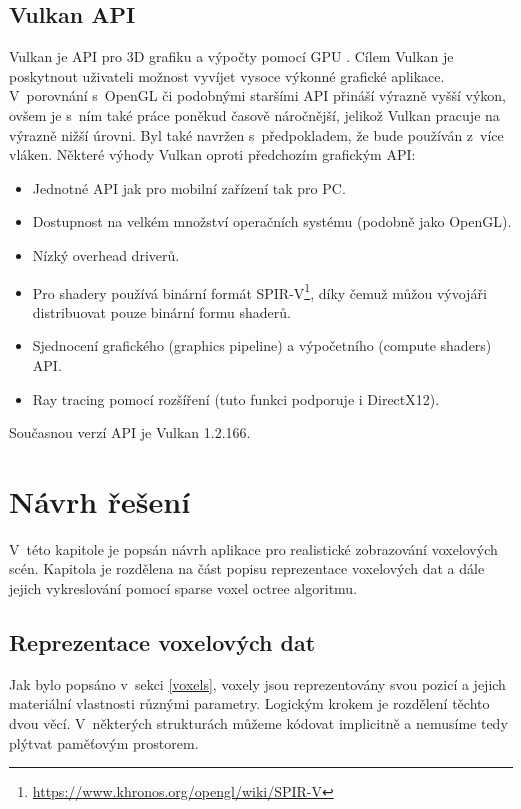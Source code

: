 \section{Vulkan API}
Vulkan je API pro 3D grafiku a výpočty pomocí GPU \cite{vulkan_web}. Cílem Vulkan je poskytnout uživateli možnost vyvíjet vysoce výkonné grafické aplikace. V~porovnání s~OpenGL či podobnými staršími API přináší výrazně vyšší výkon, ovšem je s~ním také práce poněkud časově náročnější, jelikož Vulkan pracuje na výrazně nižší úrovni. Byl také navržen s~předpokladem, že bude používán z~více vláken. Některé výhody Vulkan oproti předchozím grafickým API:

\begin{itemize}
	\item Jednotné API jak pro mobilní zařízení tak pro PC.
	\item Dostupnost na velkém množství operačních systému (podobně jako OpenGL).
	\item Nízký overhead driverů.
	\item Pro shadery používá binární formát SPIR-V\footnote{\url{https://www.khronos.org/opengl/wiki/SPIR-V}}, díky čemuž můžou vývojáři distribuovat pouze binární formu shaderů.
	\item Sjednocení grafického (graphics pipeline) a výpočetního (compute shaders) API.
	\item Ray tracing pomocí rozšíření (tuto funkci podporuje i DirectX12).
\end{itemize}

Současnou verzí API je Vulkan 1.2.166\cite{vulkanspec}.

\chapter{Návrh řešení}
\label{navrh}
V~této kapitole je popsán návrh aplikace pro realistické zobrazování voxelových scén. Kapitola je rozdělena na část popisu reprezentace voxelových dat a dále jejich vykreslování pomocí sparse voxel octree algoritmu.

\section{Reprezentace voxelových dat}\label{sec:voxel_representation}
Jak bylo popsáno v~sekci \ref{voxels}, voxely jsou reprezentovány svou pozicí a jejich materiální vlastnosti různými parametry. Logickým krokem je rozdělení těchto dvou věcí. V~některých strukturách můžeme kódovat implicitně a nemusíme tedy plýtvat paměťovým prostorem.

